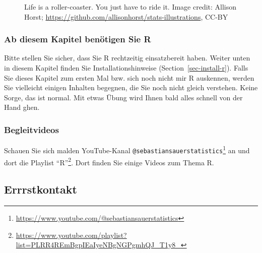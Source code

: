 \documentclass[
  letterpaper,
  DIV=11,
  numbers=noendperiod]{scrartcl}
\theoremstyle{definition}
\theoremstyle{definition}
\theoremstyle{definition}
\theoremstyle{remark}
\begin{document}
\begin{figure}


\caption{\label{fig-roller}Life is a roller-coaster. You just have to
ride it. Image credit: Allison Horst;
\url{https://github.com/allisonhorst/stats-illustrations}, CC-BY}

\end{figure}%

\subsubsection{Ab diesem Kapitel benötigen Sie
R}\label{ab-diesem-kapitel-benuxf6tigen-sie-r}

Bitte stellen Sie sicher, dass Sie R rechtzeitig einsatzbereit haben.
Weiter unten in diesem Kapitel finden Sie Installationshinweise
(Section~\ref{sec-install-r}). Falls Sie dieses Kapitel zum ersten Mal
bzw. sich noch nicht mir R auskennen, werden Sie vielleicht einigen
Inhalten begegnen, die Sie noch nicht gleich verstehen. Keine Sorge, das
ist normal. Mit etwas Übung wird Ihnen bald alles schnell von der Hand
ghen.

\subsubsection{Begleitvideos}\label{begleitvideos}

Schauen Sie sich malden YouTube-Kanal
\texttt{@sebastiansauerstatistics}\footnote{\url{https://www.youtube.com/@sebastiansauerstatistics}}
an und dort die Playlist ``R''\footnote{\url{https://www.youtube.com/playlist?list=PLRR4REmBgpIEaIyeNBgNGPgmhQJ_T1y8_}}.
Dort finden Sie einige Videos zum Thema R.

\subsection{Errrstkontakt}\label{errrstkontakt}
\end{document}

